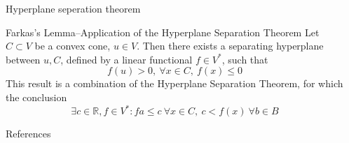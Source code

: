 \documentclass[final]{beamer}
\newlength{\sepwidth}
\newlength{\colwidth}
\newcommand{\separatorcolumn}{\begin{column}{\sepwidth}\end{column}}
\begin{document}
\begin{frame}[fragile]
\begin{columns}[t]
\begin{column}{\colwidth}
\begin{block}{Hyperplane seperation theorem}
            \begin{alertblock}{Farkas's Lemma--Application of the Hyperplane Separation Theorem}
              Let $C \subset V$ be a convex cone, $u\in V$. Then there exists a separating hyperplane between $u, C$, defined by a linear functional $f \in V^*$, such that \begin{equation}
              f(u)> 0, \ \forall x\in C, \ f(x) \le 0
              \end{equation} This result is  a combination of the Hyperplane Separation Theorem, for which the conclusion \begin{equation}
                \exists c\in \mathbb{R}, f \in V^*: fa \le c\ \forall x\in C, \ c < f(x)\ \forall b\in B
              \end{equation}
           
            \end{alertblock}
            \end{block}
            

            \begin{block}{References}
            
            
            

            \end{block}

        \end{column}

        \separatorcolumn
        \end{columns}
\end{frame}
\end{document}
